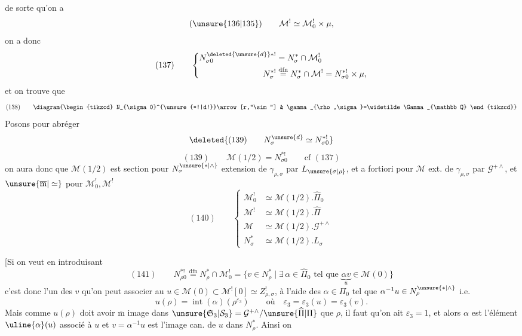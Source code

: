 de sorte qu'on a
\[
 (\unsure{136|135})\qquad \mathcal M^!\simeq\mathcal M_0^!\times\mu,
\]
on a donc
\[
 (137)\qquad
 \left\{\begin{aligned}
 N_{\sigma0}^{\deleted{\unsure{d}}*!}&=N^*_{\sigma}\cap\mathcal M_0^!\\
 N_{\sigma}^{*!}&\overset{\mathrm{dfn}}{=}N^*_{\sigma}\cap\mathcal M^!
                    =N_{\sigma0}^{*!}\times\mu,
 \end{aligned}\right.
\]
et on trouve que
\[
 (138)\qquad
 \diagram{\begin{tikzcd}
 N_{\sigma0}^{\unsure{*!|d!}}\arrow[r,"\sim"] &
 \gamma_{\rho,\sigma}=\widetilde\Gamma_{\mathbb Q}
 \end{tikzcd}}
\]
 Posons pour abréger
\[
 \deleted{(139)\qquad N_{\sigma}^{\unsure{d}}\simeq N_{\sigma0}^{*!}}
\]
\[
 (139)\qquad \mathcal M(1/2)=N_{\sigma0}^{*!}\qquad\text{cf }(137)
\]
on aura donc que $\mathcal M(1/2)$ est 
section
 pour $N_{\sigma}^{\unsure{*|\wedge}}$ extension de
$\gamma_{\rho,\sigma}$ par $L_{\unsure{\sigma|\rho}}$, et a fortiori pour
$\mathcal M$ ext. de $\gamma_{\rho,\sigma}$ par $\mathcal G^{+\wedge}$,
et  $\unsure{\overline{\mathrm m}|\simeq}$  pour
$\mathcal M_0^!,\mathcal M^!$
\[
 (140)\qquad
 \left\{\begin{aligned}
 \mathcal M_0^!&\simeq\mathcal M(1/2).\widehat\Pi_0\\
 \mathcal M^!&\simeq\mathcal M(1/2).\widehat\Pi\\
 \mathcal M&\simeq\mathcal M(1/2).\mathcal G^{+\wedge}\\
 N^*_{\sigma}&\simeq\mathcal M(1/2).L_{\sigma}
 \end{aligned}\right.
\]

[Si on veut  en introduisant
\[
 (141)\qquad
 N_{\rho0}^{*!}\overset{\mathrm{dfn}}{=}N^*_{\rho}\cap\mathcal M_0^!
 =\{v\in N^*_{\rho}\mid\exists\,\alpha\in\widehat\Pi_0\text{ tel que }
       \underbrace{\alpha v}_{u}\in\mathcal M(0)\}
\]
c'est donc l'un des $v$ qu'on peut associer au
$u\in\mathcal M(0)\subset\mathcal M^![0]\simeq Z^!_{\rho,\sigma}$,
à l'aide des $\alpha\in\Pi_0$ tel que
$\alpha^{-1}u\in N_{\rho}^{\unsure{*|\wedge}}$ i.e.
\[
 u(\rho)=\operatorname{int}(\alpha)(\rho^{\varepsilon_3})
 \qquad\text{où}\quad\varepsilon_3=\varepsilon_3(u)=\varepsilon_3(v).
\]
Mais comme $u(\rho)$ doit avoir $\overline{\mathrm m}$ image dans
$\unsure{\mathfrak S_3|\mathcal S_3}=\mathcal G^{+\wedge}/\unsure{\widehat\Pi|\Pi}$
que $\rho$, il faut qu'on ait $\varepsilon_3=1$, et alors
$\alpha$ est l'élément $\uline{\alpha}(u)$ associé à $u$ et
$v=\alpha^{-1}u$ est l'image can. de $u$ dans $N^*_{\rho}$. Ainsi on

